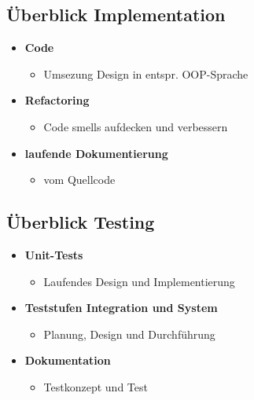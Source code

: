 \documentclass[../ZF_SWEN1.tex]{subfiles}
\begin{document}
\subsection{Überblick Implementation}
\begin{itemize}
	\item \textbf{Code}
	\begin{itemize}
		\item Umsezung Design in entspr. OOP-Sprache
	\end{itemize}
	\item \textbf{Refactoring}
	\begin{itemize}
		\item Code smells aufdecken und verbessern
	\end{itemize}
	\item \textbf{laufende Dokumentierung}
	\begin{itemize}
		\item vom Quellcode
	\end{itemize}
\end{itemize}

\subsection{Überblick Testing}
\begin{itemize}
	\item \textbf{Unit-Tests}
	\begin{itemize}
		\item Laufendes Design und Implementierung
	\end{itemize}
	\item \textbf{Teststufen Integration und System}
	\begin{itemize}
		\item Planung, Design und Durchführung
	\end{itemize}
	\item \textbf{Dokumentation}
	\begin{itemize}
		\item Testkonzept und Test
	\end{itemize}
\end{itemize}
\end{document}
